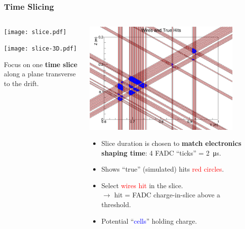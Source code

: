 \documentclass[xcolor=dvipsnames]{beamer}
\begin{document}
\begin{frame}[fragile]
  \frametitle{Time Slicing}
  
  \begin{columns}
    \begin{column}{0.35\textwidth}
      \begin{center}
        \vspace{-.5cm}

        \texttt{[image: slice.pdf]}

        \vspace{-2cm}

        \texttt{[image: slice-3D.pdf]}

        \scriptsize Focus on one \textbf{time slice} along a plane transverse to the drift.
      \end{center}
    \end{column}
    \begin{column}{0.65\textwidth}

      \includegraphics[width=0.9\textwidth]{wires-and-true-hits.png}

      \begin{itemize} \scriptsize
      \item Slice duration is chosen to \textbf{match
          electronics shaping time}: 4 FADC ``ticks'' =
        \SI{2}{\micro\second}.
      \item Shows ``true'' (simulated) hits \textcolor{red}{red circles}.
      \item Select \textcolor{red}{wires hit} in the slice.\\
        $\rightarrow$ hit = FADC charge-in-slice above a threshold.
      \item Potential ``\textcolor{blue}{cells}'' holding charge.
      \end{itemize}
    \end{column}
  \end{columns}

\end{frame}
\end{document}
